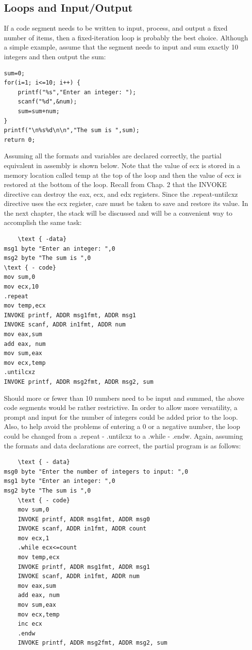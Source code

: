 \documentclass[10pt]{article}
\begin{document}
\subsection*{Loops and Input/Output}
If a code segment needs to be written to input, process, and output a fixed number of items, then a fixed-iteration loop is probably the best choice. Although a simple example, assume that the segment needs to input and sum exactly 10 integers and then output the sum:

\begin{verbatim}
sum=0;
for(i=1; i<=10; i++) {
    printf("%s","Enter an integer: ");
    scanf("%d",&num);
    sum=sum+num;
}
printf("\n%s%d\n\n","The sum is ",sum);
return 0;
\end{verbatim}

Assuming all the formats and variables are declared correctly, the partial equivalent in assembly is shown below. Note that the value of ecx is stored in a memory location called temp at the top of the loop and then the value of ecx is restored at the bottom of the loop. Recall from Chap. 2 that the INVOKE directive can destroy the eax, ecx, and edx registers. Since the .repeat-untilcxz directive uses the ecx register, care must be taken to save and restore its value. In the next chapter, the stack will be discussed and will be a convenient way to accomplish the same task:

\begin{verbatim}
    \text { -data}
msg1 byte "Enter an integer: ",0
msg2 byte "The sum is ",0
\text { - code}
mov sum,0
mov ecx,10
.repeat
mov temp,ecx
INVOKE printf, ADDR msg1fmt, ADDR msg1
INVOKE scanf, ADDR in1fmt, ADDR num
mov eax,sum
add eax, num
mov sum,eax
mov ecx,temp
.untilcxz
INVOKE printf, ADDR msg2fmt, ADDR msg2, sum
\end{verbatim}

Should more or fewer than 10 numbers need to be input and summed, the above code segments would be rather restrictive. In order to allow more versatility, a prompt and input for the number of integers could be added prior to the loop. Also, to help avoid the problems of entering a 0 or a negative number, the loop could be changed from a .repeat - .untilcxz to a .while - .endw. Again, assuming the formats and data declarations are correct, the partial program is as follows:

\begin{verbatim}
    \text { - data}
msg0 byte "Enter the number of integers to input: ",0
msg1 byte "Enter an integer: ",0
msg2 byte "The sum is ",0
    \text { - code}
    mov sum,0
    INVOKE printf, ADDR msg1fmt, ADDR msg0
    INVOKE scanf, ADDR in1fmt, ADDR count
    mov ecx,1
    .while ecx<=count
    mov temp,ecx
    INVOKE printf, ADDR msg1fmt, ADDR msg1
    INVOKE scanf, ADDR in1fmt, ADDR num
    mov eax,sum
    add eax, num
    mov sum,eax
    mov ecx,temp
    inc ecx
    .endw
    INVOKE printf, ADDR msg2fmt, ADDR msg2, sum
\end{verbatim}
\end{document}
